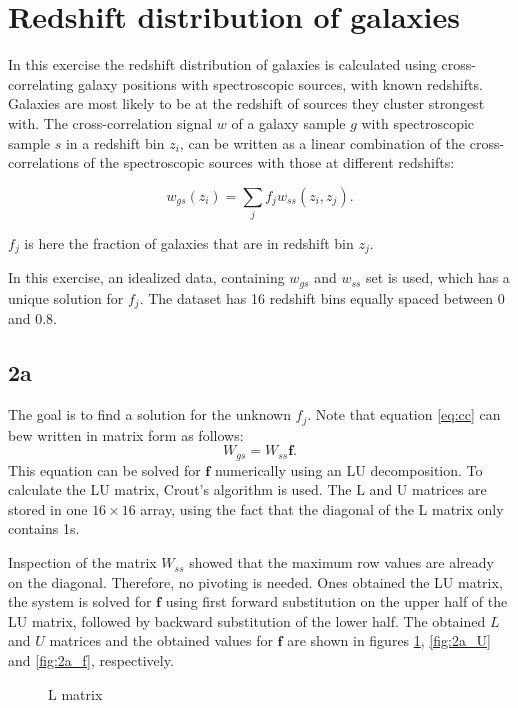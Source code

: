 \section{Redshift distribution of galaxies}
In this exercise the redshift distribution of galaxies is calculated using cross-correlating galaxy positions with spectroscopic sources, with known redshifts. Galaxies are most likely to be at the redshift of sources they cluster strongest with. The cross-correlation signal $w$ of a galaxy sample $g$ with spectroscopic sample $s$ in a redshift bin $z_i$, can be written as a linear combination of the cross-correlations of the spectroscopic sources with those at different redshifts:

\begin{equation}
    \label{eq:cc}
    w_{gs}(z_i) = \sum_j f_j w_{ss}(z_i, z_j).
\end{equation}

$f_j$ is here the fraction of galaxies that are in redshift bin $z_j$. 

In this exercise, an idealized data, containing $w_{gs}$ and $w_{ss}$ set is used, which has a unique solution for $f_j$. The dataset has 16 redshift bins equally spaced between 0 and 0.8. 

\subsection*{2a}
The goal is to find a solution for the unknown $f_j$. Note that equation \ref{eq:cc} can bew written in matrix form as follows:
\begin{equation}
    W_{gs} = W_{ss}\mathbf{f}.
\end{equation}
This equation can be solved for $\mathbf{f}$ numerically using an LU decomposition. To calculate the LU matrix, Crout's algorithm is used. The L and U matrices are stored in one $16 \times 16$ array, using the fact that the diagonal of the L matrix only contains 1s.

Inspection of the matrix $W_{ss}$ showed that the maximum row values are already on the diagonal. Therefore, no pivoting is needed. Ones obtained the LU matrix, the system is solved for $\mathbf{f}$ using first forward substitution on the upper half of the LU matrix, followed by backward substitution of the lower half. The obtained $L$ and $U$ matrices and the obtained values for $\mathbf{f}$ are shown in figures \ref{fig:2a_L}, \ref{fig:2a_U} and \ref{fig:2a_f}, respectively.

\begin{figure}[H]
    \centering
    
    \caption{L matrix}
    \label{fig:2a_L}
\end{figure}

